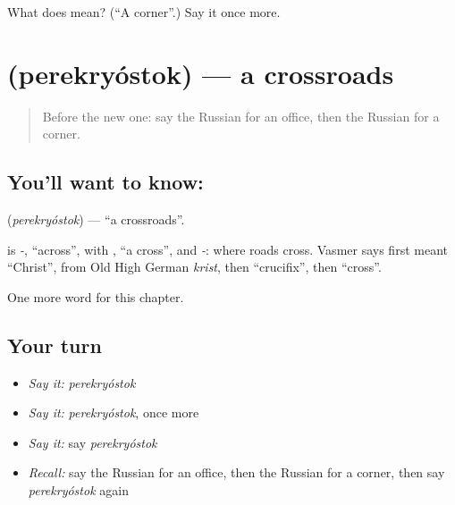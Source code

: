 \begin{tcolorbox}[breakable,colback=teal!4,colframe=teal!35!black,title={Before you move on}]
What does  mean? (\textquotedblleft{}A corner\textquotedblright{}.) Say it once more.
\end{tcolorbox}
\section[\texorpdfstring{\ru{перекрёсток} (perekryóstok)}{перекрёсток (perekryóstok)}]{ (perekryóstok) — a crossroads}

\label{lesson:RU-C89-crossroads}



\begin{quote}
Before the new one: say the Russian for an office, then the Russian for a corner.
\end{quote}

\subsection*{You'll want to know: }
\textbf{} (\emph{perekryóstok}) — \textquotedblleft{}a crossroads\textquotedblright{}.

\begin{cousinweb}
\textbf{} is \emph{-}, \textquotedblleft{}across\textquotedblright{}, with \emph{}, \textquotedblleft{}a cross\textquotedblright{}, and \emph{-}: where roads cross. Vasmer says \emph{} first meant \textquotedblleft{}Christ\textquotedblright{}, from Old High German \emph{krist}, then \textquotedblleft{}crucifix\textquotedblright{}, then \textquotedblleft{}cross\textquotedblright{}.
\end{cousinweb}

\begin{grammarlens}[title={What you've built}]
One more word for this chapter.
\end{grammarlens}

\subsection*{Your turn}
\begin{itemize}
\raggedright
  \item \emph{Say it:} \emph{perekryóstok}
  \item \emph{Say it:} \emph{perekryóstok}, once more
  \item \emph{Say it:} say \emph{perekryóstok}
  \item \emph{Recall:} say the Russian for an office, then the Russian for a corner, then say \emph{perekryóstok} again
\end{itemize}

